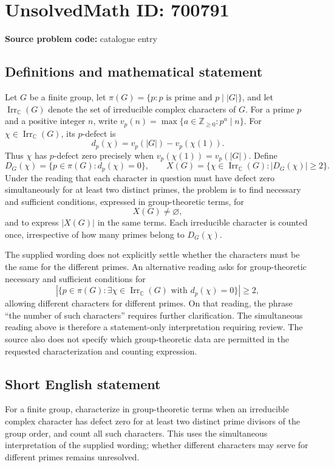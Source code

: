 \documentclass[11pt]{article}
\newcommand{\Z}{\mathbb{Z}}
\newcommand{\C}{\mathbb{C}}
\begin{document}
\section*{UnsolvedMath ID: 700791}
\textbf{Source problem code:} catalogue entry
\subsection{Definitions and mathematical statement}
Let \(G\) be a finite group, let \(\pi(G)=\{p:p\text{ is prime and }p\mid |G|\}\), and let \(\operatorname{Irr}_{\C}(G)\) denote the set of irreducible complex characters of \(G\). For a prime \(p\) and a positive integer \(n\), write \(v_p(n)=\max\{a\in\Z_{\geq 0}:p^a\mid n\}\). For \(\chi\in\operatorname{Irr}_{\C}(G)\), its \(p\)-defect is
\[
 d_p(\chi)=v_p(|G|)-v_p(\chi(1)).
\]
Thus \(\chi\) has \(p\)-defect zero precisely when \(v_p(\chi(1))=v_p(|G|)\). Define
\[
 D_G(\chi)=\{p\in\pi(G):d_p(\chi)=0\},\qquad
 X(G)=\{\chi\in\operatorname{Irr}_{\C}(G):|D_G(\chi)|\geq 2\}.
\]
Under the reading that each character in question must have defect zero simultaneously for at least two distinct primes, the problem is to find necessary and sufficient conditions, expressed in group-theoretic terms, for
\[
 X(G)\neq\varnothing,
\]
and to express \(|X(G)|\) in the same terms. Each irreducible character is counted once, irrespective of how many primes belong to \(D_G(\chi)\).

The supplied wording does not explicitly settle whether the characters must be the same for the different primes. An alternative reading asks for group-theoretic necessary and sufficient conditions for
\[
 \left|\{p\in\pi(G):\exists\chi\in\operatorname{Irr}_{\C}(G)\text{ with }d_p(\chi)=0\}\right|\geq 2,
\]
allowing different characters for different primes. On that reading, the phrase ``the number of such characters'' requires further clarification. The simultaneous reading above is therefore a statement-only interpretation requiring review. The source also does not specify which group-theoretic data are permitted in the requested characterization and counting expression.
\subsection{Short English statement}
For a finite group, characterize in group-theoretic terms when an irreducible complex character has defect zero for at least two distinct prime divisors of the group order, and count all such characters. This uses the simultaneous interpretation of the supplied wording; whether different characters may serve for different primes remains unresolved.
\end{document}
